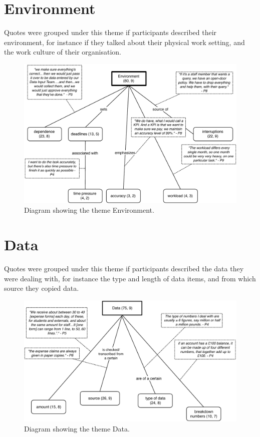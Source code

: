 \section{Environment}
Quotes were grouped under this theme if participants described their environment, for instance if they talked about their physical work setting, and the work culture of their organisation. 

\begin{figure}[!ht]
\centering
\includegraphics[width=\textwidth]{images/ch12/Environment.pdf}
\caption[Study 1 Environment diagram]{Diagram showing the theme Environment.}
\vspace{-9pt}
\label{fig:ch3_environment}
\end{figure}

\newpage

\section{Data}
Quotes were grouped under this theme if participants described the data they were dealing with, for instance the type and length of data items, and from which source they copied data.

\begin{figure}[!ht]
\centering
\includegraphics[width=\textwidth]{images/ch12/Data.pdf}
\caption[Study 1 Data diagram]{Diagram showing the theme Data.}
\vspace{-9pt}
\label{fig:ch3_data}
\end{figure}

